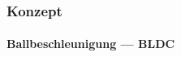 \begin{frame}
    \frametitle{Konzept}
    \framesubtitle{Ballbeschleunigung --- BLDC}
\end{frame}


